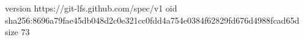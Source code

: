 version https://git-lfs.github.com/spec/v1
oid sha256:8696a79fae45db048d2c0e321cc0fdd4a754e0384f62829fd676d4988fcad65d
size 73
